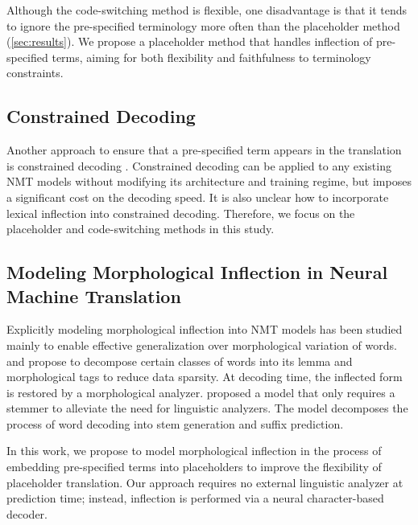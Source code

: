 Although the code-switching method is flexible, one disadvantage is that it tends to ignore the pre-specified terminology more often than the placeholder method (\cref{sec:results}).
We propose a placeholder method that handles inflection of pre-specified terms, aiming for both flexibility and faithfulness to terminology constraints.

\subsection{Constrained Decoding}
Another approach to ensure that a pre-specified term appears in the translation is constrained decoding \citep{anderson-etal-2017-guided,hokamp-liu-2017-lexically,post-vilar-2018-fast}.
Constrained decoding can be applied to any existing NMT models without modifying its architecture and training regime, but imposes a significant cost on the decoding speed.
It is also unclear how to incorporate lexical inflection into constrained decoding.
Therefore, we focus on the placeholder and code-switching methods in this study.

\subsection{Modeling Morphological Inflection in Neural Machine Translation}
Explicitly modeling morphological inflection into NMT models has been studied mainly to enable effective generalization over morphological variation of words.
\citet{tamchyna-etal-2017-modeling} and \citet{weller-di-marco-fraser-2020-modeling} propose to decompose certain classes of words into its lemma and morphological tags to reduce data sparsity.
At decoding time, the inflected form is restored by a morphological analyzer. \citet{Song_Zhang_Zhang_Luo_2018} proposed a model that only requires a stemmer to alleviate the need for linguistic analyzers. The model decomposes the process of word decoding into stem generation and suffix prediction.

In this work, we propose to model morphological inflection in the process of embedding pre-specified terms into placeholders to improve the flexibility of placeholder translation. Our approach requires no external linguistic analyzer at prediction time; instead, inflection is performed via a neural character-based decoder.

